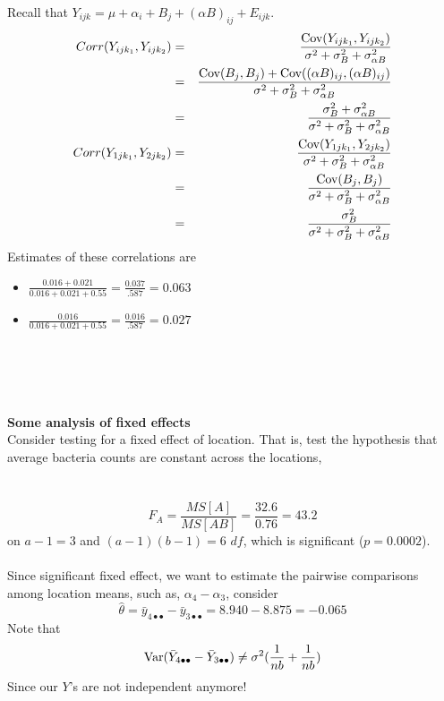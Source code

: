 Recall that $Y_{ijk}=\mu + \alpha_i + B_j + (\alpha B)_{ij} +E_{ijk}$.
\begin{eqnarray*}
Corr(Y_{ij k_1},Y_{ij k_2}) & = & \frac{\mbox{Cov}(Y_{ij k_1},Y_{ij k_2})} 
{\sigma^2 + \sigma_{B}^2 + \sigma_{\alpha B}^2}\\
& = & \frac{\mbox{Cov}(B_j,B_j) + \mbox{Cov}((\alpha B)_{ij}, (\alpha B)_{ij})}
{\sigma^2 + \sigma_{B}^2 + \sigma_{\alpha B}^2}\\
& = & \frac{\sigma_B^2 + \sigma_{\alpha B}^2}
{\sigma^2 + \sigma_{B}^2 + \sigma_{\alpha B}^2}\\
Corr(Y_{1 j k_1},Y_{2j k_2}) & = & \frac{\mbox{Cov}(Y_{1j k_1},Y_{2j k_2})} 
{\sigma^2 + \sigma_{B}^2 + \sigma_{\alpha B}^2}\\
& = & \frac{\mbox{Cov}(B_j,B_j)} 
{\sigma^2 + \sigma_{B}^2 + \sigma_{\alpha B}^2}\\
& = & \frac{\sigma_B^2} 
{\sigma^2 + \sigma_{B}^2 + \sigma_{\alpha B}^2}\\
\end{eqnarray*}
Estimates of these correlations are 
\begin{itemize}
\item $\frac{0.016+0.021}{0.016 + 0.021 + 0.55} = \frac{0.037}{.587} = 0.063$
\item $\frac{0.016}{0.016 + 0.021 + 0.55} = \frac{0.016}{.587} = 0.027$
\end{itemize}
~\\~\\~\\~\\
\textbf{Some analysis of fixed effects}\\
Consider testing for a fixed effect of location.  That is, test the hypothesis that average bacteria counts are constant across the locations, \\~\\~\\
$$ F_A = \frac{MS[A]}{MS[AB]} = \frac{32.6}{0.76} = 43.2$$
on $a-1=3$ and $(a-1)(b-1)=6$ $df$, which is significant ($p=0.0002$).\\~\\
Since significant fixed effect, we want to estimate the pairwise comparisons among location means, such as, $\alpha_4-\alpha_3$, consider
$$\hat\theta=\bar{y}_{4\bullet\bullet}-\bar{y}_{3\bullet\bullet} = 8.940-8.875 = - 0.065$$
Note that 
$$ \mbox{Var}(\bar{Y}_{4\bullet\bullet}-\bar{Y}_{3\bullet\bullet}) \neq \sigma^2(\frac{1}{nb} + \frac{1}{nb})$$
Since our $Y$'s are not independent anymore!\\~\\
